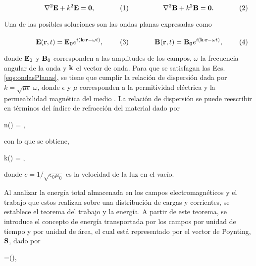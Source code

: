 	\begin{subequations}%
	\eqhalf{\nabla^2\vb{E} + k^2 \vb{E}=\vb{0},}%
	\eqhalf{\nabla^2\vb{B} + k^2 \vb{B}=\vb{0}.}\label{eq:Helmholtz}%
	\end{subequations}\vspace*{-1em}

\noindent Una de las posibles soluciones son las ondas planas expresadas como 

	\begin{subequations}%
	\eqhalf{\vb{E}(\vb{r},t) =\vb{E_0}e^{i(\vb{k}\cdot\vb{r} -\omega t)},}%
	\eqhalf{\vb{B}(\vb{r}, t) =\vb{B_0}e^{i(\vb{k}\cdot\vb{r} -\omega t)},}	
	\label{eqs:ondasPlanas}\end{subequations}\vspace*{-1em}
		
\noindent donde $\vb{E}_0$ y $\vb{B}_0$ corresponden a las amplitudes de los campos, $\omega$ la frecuencia angular de la onda y $\vb{k}$ el vector de onda. Para que se satisfagan las Ecs. \eqref{eqs:ondasPlanas}, se tiene que cumplir la relación de dispersión dada por $k=\sqrt{\mu\epsilon}\;\omega$, donde $\epsilon$ y $\mu$ corresponden a la permitividad eléctrica y la permeabilidad magnética del medio \cite{jacksonClassicalElectrodynamics2021}. La relación de dispersión se puede reescribir en términos del índice de refracción del material dado por
%
\begin{tcolorbox}
	n(\omega) = ,
	\label{eq:indice} 
\end{tcolorbox}
%	
\noindent con lo que se obtiene,
%
\begin{tcolorbox}
	k(\omega) = ,
	\label{eq:vector_onda} 
\end{tcolorbox}

\noindent donde $c=1/\sqrt{\epsilon_0\mu_0}$ es la velocidad de la luz en el vacío.

Al analizar la energía total almacenada en los campos electromagnéticos y el trabajo que estos realizan sobre una distribución de cargas y corrientes, se establece el teorema del trabajo y la energía. A partir de este teorema, se introduce el concepto de energía transportada por los campos por unidad de tiempo y por unidad de área, el cual está representado por el vector de Poynting, $\vb{S}$, dado por \cite{griffithsIntroductionElectrodynamics2023}

\begin{tcolorbox}
	=(\times{}),
	\label{eq:vect_Poynting} 
\end{tcolorbox}

